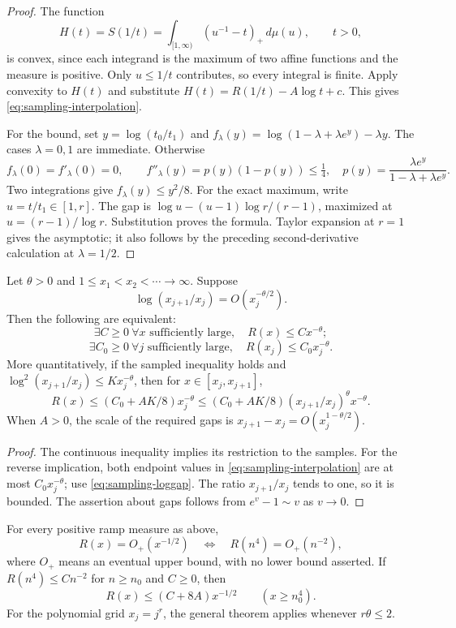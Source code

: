 \begin{proof}
The function
\[
 H(t)=S(1/t)=\int_{[1,\infty)}(u^{-1}-t)_+\,d\mu(u),\qquad t>0,
\]
is convex, since each integrand is the maximum of two affine functions
and the measure is positive. Only $u\le1/t$ contributes, so every integral
is finite. Apply convexity to $H(t)$ and substitute
$H(t)=R(1/t)-A\log t+c$. This gives
\eqref{eq:sampling-interpolation}.

For the bound, set $y=\log(t_0/t_1)$ and
$f_\lambda(y)=\log(1-\lambda+\lambda e^y)-\lambda y$.
The cases $\lambda=0,1$ are immediate. Otherwise
\[
 f_\lambda(0)=f'_\lambda(0)=0,
 \qquad f''_\lambda(y)=p(y)(1-p(y))\le\tfrac14,
 \quad p(y)=\frac{\lambda e^y}{1-\lambda+\lambda e^y}.
\]
Two integrations give $f_\lambda(y)\le y^2/8$.
For the exact maximum, write $u=t/t_1\in[1,r]$. The gap is
$\log u-(u-1)\log r/(r-1)$, maximized at
$u=(r-1)/\log r$. Substitution proves the formula. Taylor expansion
at $r=1$ gives the asymptotic; it also follows by the preceding
second-derivative calculation at $\lambda=1/2$.
\end{proof}

\begin{theorem}\label{thm:sampling-general}
Let $\theta>0$ and $1\le x_1<x_2<\cdots\to\infty$. Suppose
\[
 \log(x_{j+1}/x_j)=O(x_j^{-\theta/2}).
\]
Then the following are equivalent:
\[
 \exists C\ge0\ \forall x\text{ sufficiently large},\quad
 R(x)\le Cx^{-\theta};
\]
\[
 \exists C_0\ge0\ \forall j\text{ sufficiently large},\quad
 R(x_j)\le C_0x_j^{-\theta}.
\]
More quantitatively, if the sampled inequality holds and
$\log^2(x_{j+1}/x_j)\le Kx_j^{-\theta}$, then for
$x\in[x_j,x_{j+1}]$,
\[
 R(x)\le(C_0+AK/8)x_j^{-\theta}
 \le(C_0+AK/8)(x_{j+1}/x_j)^\theta x^{-\theta}.
\]
When $A>0$, the scale of the required gaps is
$x_{j+1}-x_j=O(x_j^{1-\theta/2})$.
\end{theorem}

\begin{proof}
The continuous inequality implies its restriction to the samples.
For the reverse implication, both endpoint values in
\eqref{eq:sampling-interpolation} are at most $C_0x_j^{-\theta}$;
use \eqref{eq:sampling-loggap}. The ratio $x_{j+1}/x_j$ tends to one,
so it is bounded. The assertion about gaps follows from
$e^v-1\sim v$ as $v\to0$.
\end{proof}

\begin{corollary}\label{cor:sampling-quartic}
For every positive ramp measure as above,
\[
 R(x)=O_+(x^{-1/2})
 \quad\Longleftrightarrow\quad
 R(n^4)=O_+(n^{-2}),
\]
where $O_+$ means an eventual upper bound, with no lower bound asserted.
If $R(n^4)\le Cn^{-2}$ for $n\ge n_0$ and $C\ge0$, then
\[
 R(x)\le(C+8A)x^{-1/2}\qquad(x\ge n_0^4).
\]
For the polynomial grid $x_j=j^r$, the general theorem applies whenever
$r\theta\le2$.
\end{corollary}

